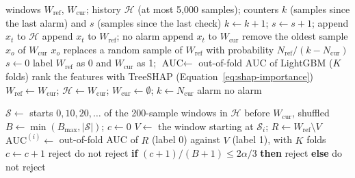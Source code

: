 \begin{algorithm}[htbp]
\caption{EADD: processing of one sample $x_t$}\label{alg:eadd}
\begin{algorithmic}[1]
\Require windows $W_{\mathrm{ref}}$, $W_{\mathrm{cur}}$; history $\mathcal{H}$ (at most 5,000 samples); counters $k$ (samples since the last alarm) and $s$ (samples since the last check)
\State $k \gets k + 1$; \quad $s \gets s + 1$; \quad append $x_t$ to $\mathcal{H}$
    \State append $x_t$ to $W_{\mathrm{ref}}$; \Return no alarm 
\EndIf
\State append $x_t$ to $W_{\mathrm{cur}}$
    \State remove the oldest sample $x_o$ of $W_{\mathrm{cur}}$ 
    \State $x_o$ replaces a random sample of $W_{\mathrm{ref}}$ with probability $N_{\mathrm{ref}}/(k - N_{\mathrm{cur}})$
\EndIf
{}
    \State $s \gets 0$
    \State label $W_{\mathrm{ref}}$ as 0 and $W_{\mathrm{cur}}$ as 1; $\text{AUC} \gets$ out-of-fold AUC of LightGBM ($K$ folds)
        \State rank the features with TreeSHAP (Equation~\ref{eq:shap-importance})
        \State $W_{\mathrm{ref}} \gets W_{\mathrm{cur}}$; \quad $\mathcal{H} \gets W_{\mathrm{cur}}$; \quad $W_{\mathrm{cur}} \gets \emptyset$; \quad $k \gets N_{\mathrm{cur}}$
        \State \Return alarm 
    \EndIf
\EndIf
\State \Return no alarm
\end{algorithmic}
\end{algorithm}

\begin{algorithm}[htbp]
\caption{ASPT with the history null}\label{alg:aspt}
\begin{algorithmic}[1]
\State $\mathcal{S} \gets$ starts $0, 10, 20, \ldots$ of the 200-sample windows in $\mathcal{H}$ before $W_{\mathrm{cur}}$, shuffled
\State $B \gets \min(B_{\max}, |\mathcal{S}|)$; \quad $c \gets 0$
    \State $V \gets$ the window starting at $\mathcal{S}_i$; \quad $R \gets W_{\mathrm{ref}} \setminus V$
    \State $\text{AUC}^{(i)} \gets$ out-of-fold AUC of $R$ (label 0) against $V$ (label 1), with $K$ folds
     $c \gets c + 1$ \EndIf
         \Return reject 
        \EndIf
         \Return do not reject 
        \EndIf
    \EndIf
\EndFor
\State \textbf{if} $(c+1)/(B+1) \leq 2\alpha/3$ \textbf{then} \Return reject \textbf{else} \Return do not reject
\EndFunction
\end{algorithmic}
\end{algorithm}

